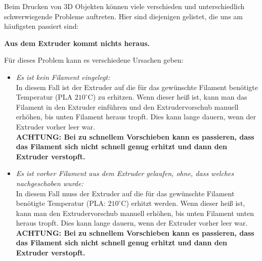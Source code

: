 \documentclass[11pt,a4paper]{scrartcl}
\begin{document}
Beim Drucken von 3D Objekten können viele verschieden und unterschiedlich schwerwiegende Probleme auftreten. Hier sind diejenigen gelistet, die uns am häufigsten passiert sind:\\
\begin{description}

\item \textbf{Aus dem Extruder kommt nichts heraus.}\\
Für dieses Problem kann es verschiedene Ursachen geben:
\begin{itemize}
\item \textit{Es ist kein Filament eingelegt:}\\
In diesem Fall ist der Extruder auf die für das gewünschte Filament benötigte Temperatur (PLA $210^\circ$C) zu erhitzen. Wenn dieser heiß ist, kann man das Filament in den Extruder einführen und den Extrudervorschub manuell erhöhen, bis unten Filament heraus tropft. Dies kann lange dauern, wenn der Extruder vorher leer war.\\
\textbf{ACHTUNG: Bei zu schnellem Vorschieben kann es passieren, dass das Filament sich nicht schnell genug erhitzt und dann den Extruder verstopft.}

\item \textit{Es ist vorher Filament aus dem Extruder gelaufen, ohne, dass welches nachgeschoben wurde:}\\
In diesem Fall muss der Extruder auf die für das gewünschte Filament benötigte Temperatur (PLA: $210^\circ$C) erhitzt werden. Wenn dieser heiß ist, kann man den Extrudervorschub manuell erhöhen, bis unten Filament unten heraus tropft. Dies kann lange dauern, wenn der Extruder vorher leer war.\\
\textbf{ACHTUNG: Bei zu schnellem Vorschieben kann es passieren, dass das Filament sich nicht schnell genug erhitzt und dann den Extruder verstopft.}
\end{itemize}


\end{description}
\end{document}
